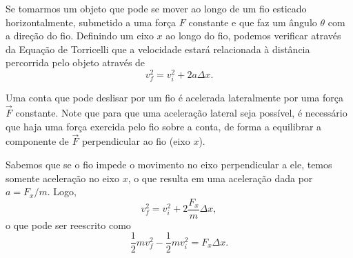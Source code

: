 
Se tomarmos um objeto que pode se mover ao longo de um fio esticado horizontalmente, submetido a uma força $F$ constante e que faz um ângulo $\theta$ com a direção do fio. Definindo um eixo $x$ ao longo do fio, podemos verificar através da Equação de Torricelli que a velocidade estará relacionada à distância percorrida pelo objeto através de
\begin{equation}
  v_f^2 = v_i^2 + 2 a \Delta x.
\end{equation}

\begin{marginfigure}
\centering
{}
\caption{Uma conta que pode deslisar por um fio é acelerada lateralmente por uma força $\vec{F}$ constante. Note que para que uma aceleração lateral seja possível, é necessário que haja uma força exercida pelo fio sobre a conta, de forma a equilibrar a componente de $\vec{F}$ perpendicular ao fio (eixo $x$).}
\end{marginfigure}

\noindent{}Sabemos que se o fio impede o movimento no eixo perpendicular a ele, temos somente aceleração no eixo $x$, o que resulta em uma aceleração dada por $a = F_x/m$. Logo,
\begin{equation}
  v_f^2 = v_i^2 + 2 \frac{F_x}{m} \Delta x,
\end{equation}
%
o que pode ser reescrito como
\begin{equation}
  \frac{1}{2} m v_f^2 - \frac{1}{2} m v_i^2 = F_x \Delta x.
\end{equation}

